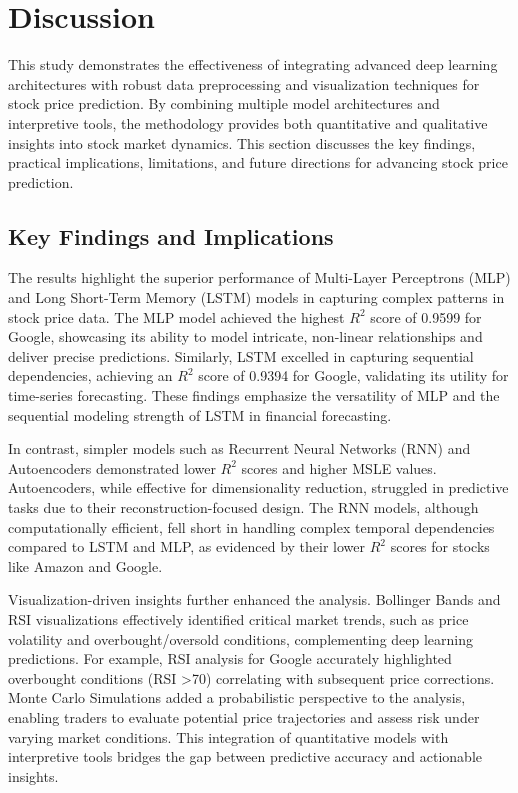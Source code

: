 \documentclass[conference]{IEEEtran}
\begin{document}
\section{Discussion}

This study demonstrates the effectiveness of integrating advanced deep learning architectures with robust data preprocessing and visualization techniques for stock price prediction. By combining multiple model architectures and interpretive tools, the methodology provides both quantitative and qualitative insights into stock market dynamics. This section discusses the key findings, practical implications, limitations, and future directions for advancing stock price prediction.

\subsection{Key Findings and Implications}

The results highlight the superior performance of Multi-Layer Perceptrons (MLP) and Long Short-Term Memory (LSTM) models in capturing complex patterns in stock price data. The MLP model achieved the highest $R^2$ score of 0.9599 for Google, showcasing its ability to model intricate, non-linear relationships and deliver precise predictions. Similarly, LSTM excelled in capturing sequential dependencies, achieving an $R^2$ score of 0.9394 for Google, validating its utility for time-series forecasting. These findings emphasize the versatility of MLP and the sequential modeling strength of LSTM in financial forecasting.

In contrast, simpler models such as Recurrent Neural Networks (RNN) and Autoencoders demonstrated lower $R^2$ scores and higher MSLE values. Autoencoders, while effective for dimensionality reduction, struggled in predictive tasks due to their reconstruction-focused design. The RNN models, although computationally efficient, fell short in handling complex temporal dependencies compared to LSTM and MLP, as evidenced by their lower $R^2$ scores for stocks like Amazon and Google.

Visualization-driven insights further enhanced the analysis. Bollinger Bands and RSI visualizations effectively identified critical market trends, such as price volatility and overbought/oversold conditions, complementing deep learning predictions. For example, RSI analysis for Google accurately highlighted overbought conditions (RSI \textgreater 70) correlating with subsequent price corrections. Monte Carlo Simulations added a probabilistic perspective to the analysis, enabling traders to evaluate potential price trajectories and assess risk under varying market conditions. This integration of quantitative models with interpretive tools bridges the gap between predictive accuracy and actionable insights.
\end{document}
